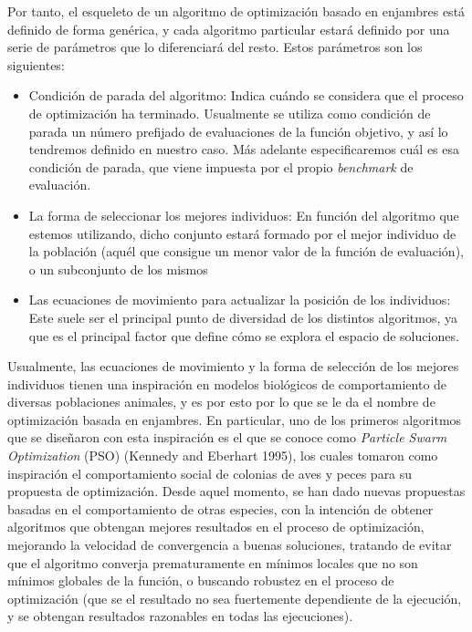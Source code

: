 \documentclass[
  a4paper,
,tablecaptionabove
]{scrartcl}
\providecommand{\tightlist}{%
  \setlength{\itemsep}{0pt}\setlength{\parskip}{0pt}}
\begin{document}
Por tanto, el esqueleto de un algoritmo de optimización basado en
enjambres está definido de forma genérica, y cada algoritmo particular
estará definido por una serie de parámetros que lo diferenciará del
resto. Estos parámetros son los siguientes:

\begin{itemize}
\tightlist
\item
  Condición de parada del algoritmo: Indica cuándo se considera que el
  proceso de optimización ha terminado. Usualmente se utiliza como
  condición de parada un número prefijado de evaluaciones de la función
  objetivo, y así lo tendremos definido en nuestro caso. Más adelante
  especificaremos cuál es esa condición de parada, que viene impuesta
  por el propio \emph{benchmark} de evaluación.
\item
  La forma de seleccionar los mejores individuos: En función del
  algoritmo que estemos utilizando, dicho conjunto estará formado por el
  mejor individuo de la población (aquél que consigue un menor valor de
  la función de evaluación), o un subconjunto de los mismos
\item
  Las ecuaciones de movimiento para actualizar la posición de los
  individuos: Este suele ser el principal punto de diversidad de los
  distintos algoritmos, ya que es el principal factor que define cómo se
  explora el espacio de soluciones.
\end{itemize}

Usualmente, las ecuaciones de movimiento y la forma de selección de los
mejores individuos tienen una inspiración en modelos biológicos de
comportamiento de diversas poblaciones animales, y es por esto por lo
que se le da el nombre de optimización basada en enjambres. En
particular, uno de los primeros algoritmos que se diseñaron con esta
inspiración es el que se conoce como \emph{Particle Swarm Optimization}
(PSO) (Kennedy and Eberhart 1995), los cuales tomaron como inspiración
el comportamiento social de colonias de aves y peces para su propuesta
de optimización. Desde aquel momento, se han dado nuevas propuestas
basadas en el comportamiento de otras especies, con la intención de
obtener algoritmos que obtengan mejores resultados en el proceso de
optimización, mejorando la velocidad de convergencia a buenas
soluciones, tratando de evitar que el algoritmo converja prematuramente
en mínimos locales que no son mínimos globales de la función, o buscando
robustez en el proceso de optimización (que se el resultado no sea
fuertemente dependiente de la ejecución, y se obtengan resultados
razonables en todas las ejecuciones).
\end{document}
